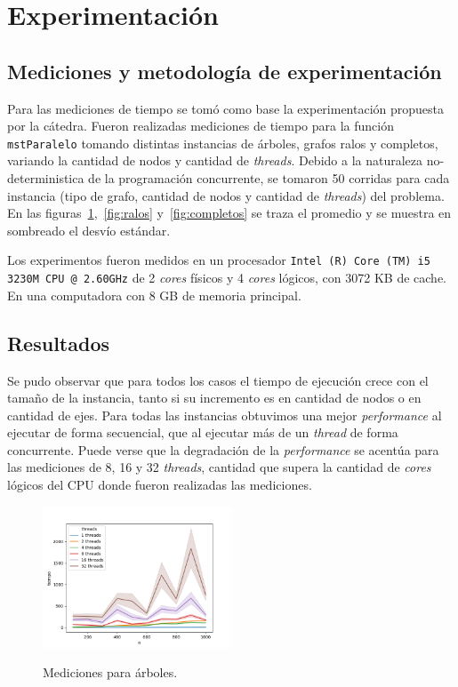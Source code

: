 \section{Experimentación}
\subsection{Mediciones y metodología de experimentación}

Para las mediciones de tiempo se tomó como base la experimentación propuesta
por la cátedra.
Fueron realizadas mediciones de tiempo para la función \texttt{mstParalelo}
tomando distintas instancias de árboles, grafos ralos y completos, variando la
cantidad de nodos y cantidad de \textit{threads}.
Debido a la naturaleza no-deterministica de la programación concurrente, se
tomaron 50 corridas para cada instancia (tipo de grafo, cantidad de nodos y
cantidad de \textit{threads}) del problema. En las
figuras~\ref{fig:arboles},~\ref{fig:ralos} y~\ref{fig:completos} se traza el
promedio y se muestra en sombreado el desvío estándar.

Los experimentos fueron medidos en un procesador \texttt{Intel (R) Core (TM) i5
3230M CPU @ 2.60GHz} de 2 \textit{cores} físicos y 4 \textit{cores} lógicos,
con 3072 KB de cache. En una computadora con 8 GB de memoria principal.

\subsection{Resultados}

Se pudo observar que para todos los casos el tiempo de ejecución crece con el
tamaño de la instancia, tanto si su incremento es en cantidad de nodos o en
cantidad de ejes.
Para todas las instancias obtuvimos una mejor
\textit{performance} al ejecutar de forma secuencial, que al ejecutar más de un
\textit{thread} de forma
concurrente.
Puede verse que la degradación de la \textit{performance} se acentúa para las
mediciones de 8, 16 y 32 \textit{threads}, cantidad que supera la cantidad de
\textit{cores} lógicos del CPU donde fueron realizadas las mediciones.

\begin{figure}[h]
\caption{Mediciones para árboles.}
\centering
\includegraphics[width=0.5\textwidth]{imagenes/arbol.png} \\%
\label{fig:arboles}
\end{figure}

